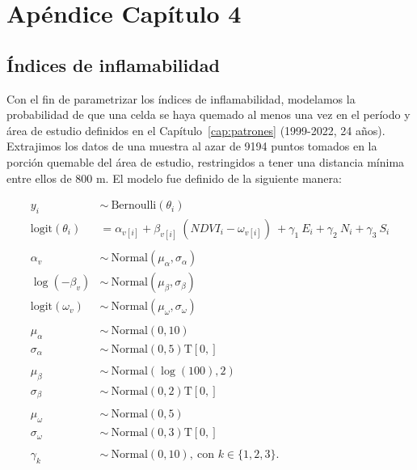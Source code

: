 \newpage{\ }
\cleardoublepage

\chapter{Apéndice Capítulo 4}\label{append_04}

\section{Índices de inflamabilidad}\label{append:FI}

Con el fin de parametrizar los índices de inflamabilidad, modelamos la probabilidad de que una celda se haya quemado al menos una vez en el período y área de estudio definidos en el Capítulo~\ref{cap:patrones} (1999-2022, 24 años). Extrajimos los datos de una muestra al azar de 9194 puntos tomados en la porción quemable del área de estudio, restringidos a tener una distancia mínima entre ellos de 800 m. El modelo fue definido de la siguiente manera:

\begin{equation}
\begin{aligned}
    y_i &\sim \ \text{Bernoulli}(\theta_i) \\
    \text{logit}(\theta_i) &= \alpha_{v[i]} + \beta_{v[i]} \ (NDVI_i - \omega_{v[i]}) \ +\gamma_1\ E_i + \gamma_2 \ N_i + \gamma_3 \ S_i \\
    \\
    \alpha_v &\sim \ \text{Normal}(\mu_{\alpha}, \sigma_{\alpha}) \\ 
    \log(-\beta_v) &\sim \ \text{Normal}(\mu_{\beta}, \sigma_{\beta}) \\
    \text{logit}(\omega_v) &\sim \ \text{Normal}(\mu_{\omega}, \sigma_{\omega}) \\
    \\
    \mu_{\alpha} &\sim \ \text{Normal}(0, 10) \\ 
    \sigma_{\alpha} &\sim \ \text{Normal}(0, 5)\text{T}[0, ] \\ 
    \\
    \mu_{\beta} &\sim \ \text{Normal}(\log(100), 2) \\ 
    \sigma_{\beta} &\sim \ \text{Normal}(0, 2)\text{T}[0, ] \\ 
    \\
    \mu_{\omega} &\sim \ \text{Normal}(0, 5) \\ 
    \sigma_{\omega} &\sim \ \text{Normal}(0, 3)\text{T}[0, ] \\ 
    \\
    \gamma_k &\sim \ \text{Normal}(0, 10),\ \text{con } k \in \{1, 2, 3\}.
\end{aligned}
\end{equation}

